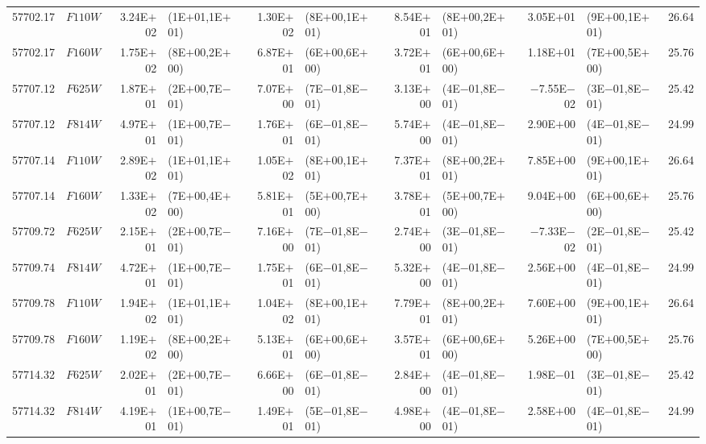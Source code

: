 \begin{tabular}{r c r @{\hspace{0.5em}} l r @{\hspace{0.5em}} l r @{\hspace{0.5em}} l r @{\hspace{0.5em}} l r}
57702.17 & $F110W$ & 3.24E$+$02 & (1E$+$01,1E$+$01) & 1.30E$+$02 & (8E$+$00,1E$+$01) & 8.54E$+$01 & (8E$+$00,2E$+$01) & 3.05E$+$01 & (9E$+$00,1E$+$01) & 26.64\\
57702.17 & $F160W$ & 1.75E$+$02 & (8E$+$00,2E$+$00) & 6.87E$+$01 & (6E$+$00,6E$+$00) & 3.72E$+$01 & (6E$+$00,6E$+$00) & 1.18E$+$01 & (7E$+$00,5E$+$00) & 25.76\\
57707.12 & $F625W$ & 1.87E$+$01 & (2E$+$00,7E$-$01) & 7.07E$+$00 & (7E$-$01,8E$-$01) & 3.13E$+$00 & (4E$-$01,8E$-$01) & $-$7.55E$-$02 & (3E$-$01,8E$-$01) & 25.42\\
57707.12 & $F814W$ & 4.97E$+$01 & (1E$+$00,7E$-$01) & 1.76E$+$01 & (6E$-$01,8E$-$01) & 5.74E$+$00 & (4E$-$01,8E$-$01) & 2.90E$+$00 & (4E$-$01,8E$-$01) & 24.99\\
57707.14 & $F110W$ & 2.89E$+$02 & (1E$+$01,1E$+$01) & 1.05E$+$02 & (8E$+$00,1E$+$01) & 7.37E$+$01 & (8E$+$00,2E$+$01) & 7.85E$+$00 & (9E$+$00,1E$+$01) & 26.64\\
57707.14 & $F160W$ & 1.33E$+$02 & (7E$+$00,4E$+$00) & 5.81E$+$01 & (5E$+$00,7E$+$00) & 3.78E$+$01 & (5E$+$00,7E$+$00) & 9.04E$+$00 & (6E$+$00,6E$+$00) & 25.76\\
57709.72 & $F625W$ & 2.15E$+$01 & (2E$+$00,7E$-$01) & 7.16E$+$00 & (7E$-$01,8E$-$01) & 2.74E$+$00 & (3E$-$01,8E$-$01) & $-$7.33E$-$02 & (2E$-$01,8E$-$01) & 25.42\\
57709.74 & $F814W$ & 4.72E$+$01 & (1E$+$00,7E$-$01) & 1.75E$+$01 & (6E$-$01,8E$-$01) & 5.32E$+$00 & (4E$-$01,8E$-$01) & 2.56E$+$00 & (4E$-$01,8E$-$01) & 24.99\\
57709.78 & $F110W$ & 1.94E$+$02 & (1E$+$01,1E$+$01) & 1.04E$+$02 & (8E$+$00,1E$+$01) & 7.79E$+$01 & (8E$+$00,2E$+$01) & 7.60E$+$00 & (9E$+$00,1E$+$01) & 26.64\\
57709.78 & $F160W$ & 1.19E$+$02 & (8E$+$00,2E$+$00) & 5.13E$+$01 & (6E$+$00,6E$+$00) & 3.57E$+$01 & (6E$+$00,6E$+$00) & 5.26E$+$00 & (7E$+$00,5E$+$00) & 25.76\\
57714.32 & $F625W$ & 2.02E$+$01 & (2E$+$00,7E$-$01) & 6.66E$+$00 & (6E$-$01,8E$-$01) & 2.84E$+$00 & (4E$-$01,8E$-$01) & 1.98E$-$01 & (3E$-$01,8E$-$01) & 25.42\\
57714.32 & $F814W$ & 4.19E$+$01 & (1E$+$00,7E$-$01) & 1.49E$+$01 & (5E$-$01,8E$-$01) & 4.98E$+$00 & (4E$-$01,8E$-$01) & 2.58E$+$00 & (4E$-$01,8E$-$01) & 24.99\\
\hline\hline
\end{tabular}

